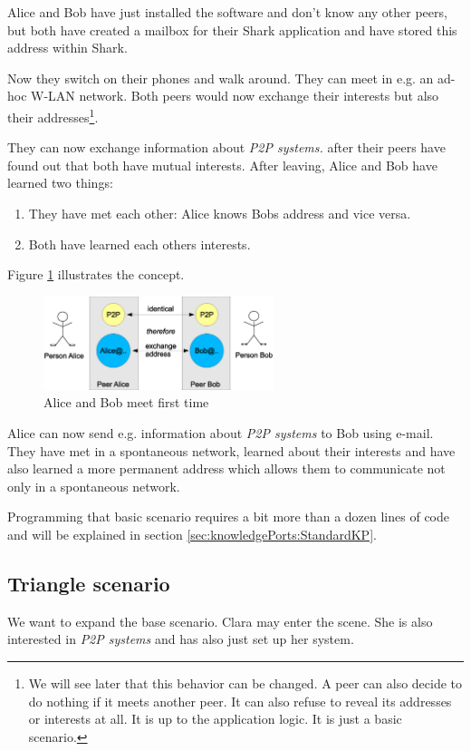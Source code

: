 Alice and Bob have just installed the software and don't know any other peers, but both have created a mailbox for their Shark application and have stored this address within Shark.

Now they switch on their phones and walk around. They can meet in e.g. an ad-hoc W-LAN network. Both peers would now exchange their interests but also their addresses\footnote{We will see later that this behavior can be changed. A peer can also decide to do nothing if it meets another peer. It can also refuse to reveal its addresses or interests at all. It is up to the application logic. It is just a basic scenario.}.

They can now exchange information about {\it P2P systems.} after their peers have found out that both have mutual interests. After leaving, Alice and Bob have learned two things: 

\begin{enumerate}
    \item They have met each other: Alice knows Bobs address and vice versa.
    \item Both have learned each others interests.
\end{enumerate}

Figure \ref{fig:basisscenario} illustrates the concept.

\begin{figure}[t]
\centering
\includegraphics[width=0.60\textwidth]{basisscenario.eps}
\caption{Alice and Bob meet first time}
\label{fig:basisscenario}
\end{figure}

Alice can now send e.g. information about {\it P2P systems} to Bob using e-mail. 
They have met in a spontaneous network, learned about their interests and have also learned a more permanent address which allows them to communicate not only in a spontaneous network.

Programming that basic scenario requires a bit more than a dozen lines of code and will be explained in section \ref{sec:knowledgePorts:StandardKP}.

\subsection{Triangle scenario}
We want to expand the base scenario. Clara may enter the scene. She is also interested in {\it P2P systems} and has also just set up her system.

